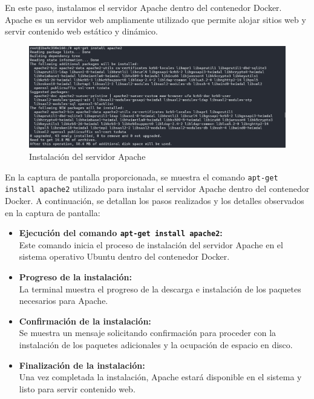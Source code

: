 \documentclass{article}
\begin{document}
En este paso, instalamos el servidor Apache dentro del contenedor Docker. Apache es un servidor web ampliamente utilizado que permite alojar sitios web y servir contenido web estático y dinámico.

\begin{figure}[h]
    \centering
    \includegraphics[width=1\textwidth]{latex/img/install_apache.png}
    \caption{Instalación del servidor Apache}
    \label{fig:install_apache}
\end{figure}

En la captura de pantalla proporcionada, se muestra el comando \texttt{apt-get install apache2} utilizado para instalar el servidor Apache dentro del contenedor Docker. A continuación, se detallan los pasos realizados y los detalles observados en la captura de pantalla:

\begin{itemize}
    \item \textbf{Ejecución del comando \texttt{apt-get install apache2}:} \\
    Este comando inicia el proceso de instalación del servidor Apache en el sistema operativo Ubuntu dentro del contenedor Docker.

    \item \textbf{Progreso de la instalación:} \\
    La terminal muestra el progreso de la descarga e instalación de los paquetes necesarios para Apache.

    \item \textbf{Confirmación de la instalación:} \\
    Se muestra un mensaje solicitando confirmación para proceder con la instalación de los paquetes adicionales y la ocupación de espacio en disco.

    \item \textbf{Finalización de la instalación:} \\
    Una vez completada la instalación, Apache estará disponible en el sistema y listo para servir contenido web.
\end{itemize}
\end{document}
